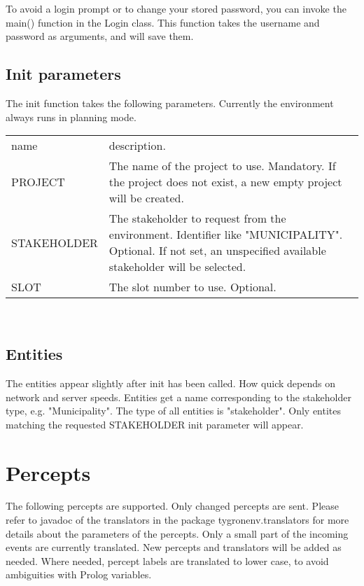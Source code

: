 \documentclass[english,11pt]{article}
\begin{document}
To avoid a login prompt or to change your stored password, you can invoke the main() function in the Login class. This function takes the username and password as arguments, and will save them. 


\subsection{Init parameters}
The init function takes the following parameters. Currently the environment always runs in planning mode.

\begin{tabularx}{\textwidth}{lX}
 name & description. \\
 PROJECT & The name of the project to use.  Mandatory. If the project does not exist, a new empty project will be created. \\
 STAKEHOLDER & The stakeholder to request from the environment. Identifier like "MUNICIPALITY". Optional. If not set, an unspecified available stakeholder will be selected. \\
 SLOT &  The slot number to use.  Optional.  \\
\end{tabularx}\\


\subsection{Entities}
The entities appear slightly after init has been called. How quick depends on network and server speeds.
Entities get a name corresponding to the stakeholder type, e.g. "Municipality". The type of all entities is "stakeholder".
Only entites matching the requested STAKEHOLDER init parameter will appear.

\section{Percepts}

The following percepts are supported. Only changed percepts are sent. Please refer to javadoc of the translators in the package tygronenv.translators for more details about the parameters of the percepts. Only a small part of the incoming events are currently translated. New percepts and translators will be added as needed. Where needed, percept labels are translated to lower case, to avoid ambiguities with Prolog variables.
\newline
\end{document}
